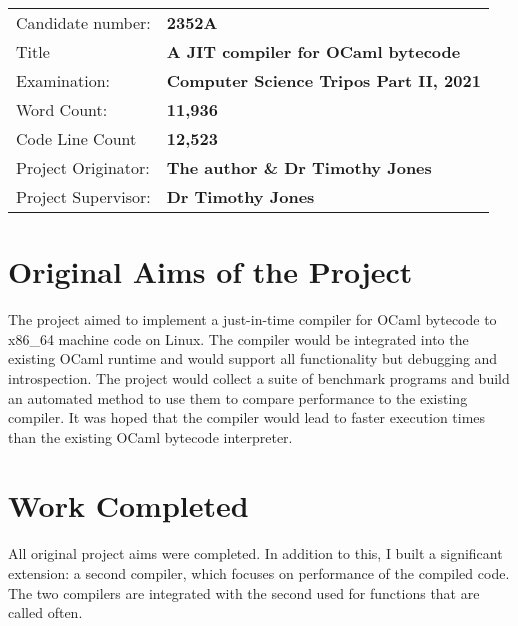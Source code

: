  {\large

  \begin{tabular}{ll}
      Candidate number:   & \textbf{2352A}                                 \\
      Title               & \textbf{A JIT compiler for OCaml bytecode}     \\
      Examination:        & \textbf{Computer Science Tripos Part II, 2021} \\
      Word Count:         & \textbf{11,936\footnotemark}                   \\
      Code Line Count     & \textbf{12,523\footnotemark}                   \\
      Project Originator: & \textbf{The author \& Dr Timothy Jones}        \\
      Project Supervisor: & \textbf{Dr Timothy Jones}                      \\
  \end{tabular}
 }

\section*{Original Aims of the Project}

The project aimed to implement a just-in-time compiler for OCaml bytecode to x86\_64 machine code
on
Linux. The compiler would be integrated into the existing OCaml runtime and would support all
functionality but debugging and introspection. The project would collect a suite of benchmark
programs
and build an automated method to use them to compare performance to the existing compiler. It was
hoped
that the compiler would lead to faster execution times than the existing OCaml bytecode
interpreter.

\section*{Work Completed}

All original project aims were completed. In addition to this, I built a significant
extension: a second compiler, which focuses on performance of the compiled code. The
two compilers are integrated with the second used for functions that are called often.

